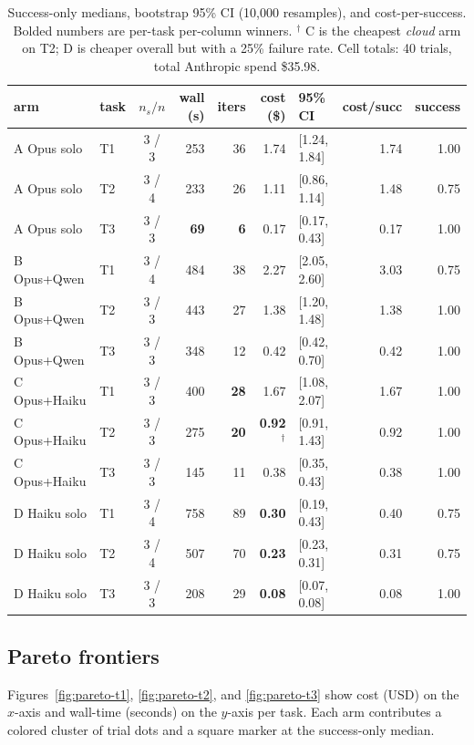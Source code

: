 \documentclass[11pt,a4paper]{article}
\begin{document}
\begin{table}[H]
\centering
\small
\begin{tabular}{l l c r r r l r r}
\toprule
\textbf{arm} & \textbf{task} & \textbf{$n_{s}/n$} & \textbf{wall (s)} & \textbf{iters} & \textbf{cost (\$)} & \textbf{95\% CI} & \textbf{cost/succ} & \textbf{success} \\
\midrule
A Opus solo   & T1 & 3 / 3 & 253 & 36 & 1.74 & [1.24, 1.84] & 1.74 & 1.00 \\
A Opus solo   & T2 & 3 / 4 & 233 & 26 & 1.11 & [0.86, 1.14] & 1.48 & 0.75 \\
A Opus solo   & T3 & 3 / 3 & \textbf{69} & \textbf{6}  & 0.17 & [0.17, 0.43] & 0.17 & 1.00 \\
\midrule
B Opus+Qwen   & T1 & 3 / 4 & 484 & 38 & 2.27 & [2.05, 2.60] & 3.03 & 0.75 \\
B Opus+Qwen   & T2 & 3 / 3 & 443 & 27 & 1.38 & [1.20, 1.48] & 1.38 & 1.00 \\
B Opus+Qwen   & T3 & 3 / 3 & 348 & 12 & 0.42 & [0.42, 0.70] & 0.42 & 1.00 \\
\midrule
C Opus+Haiku  & T1 & 3 / 3 & 400 & \textbf{28} & 1.67 & [1.08, 2.07] & 1.67 & 1.00 \\
C Opus+Haiku  & T2 & 3 / 3 & 275 & \textbf{20} & \textbf{0.92}$^\dagger$ & [0.91, 1.43] & 0.92 & 1.00 \\
C Opus+Haiku  & T3 & 3 / 3 & 145 & 11 & 0.38 & [0.35, 0.43] & 0.38 & 1.00 \\
\midrule
D Haiku solo  & T1 & 3 / 4 & 758 & 89 & \textbf{0.30} & [0.19, 0.43] & 0.40 & 0.75 \\
D Haiku solo  & T2 & 3 / 4 & 507 & 70 & \textbf{0.23} & [0.23, 0.31] & 0.31 & 0.75 \\
D Haiku solo  & T3 & 3 / 3 & 208 & 29 & \textbf{0.08} & [0.07, 0.08] & 0.08 & 1.00 \\
\bottomrule
\end{tabular}
\caption{Success-only medians, bootstrap 95\% CI (10,000 resamples), and cost-per-success. Bolded numbers are per-task per-column winners. $^\dagger$ C is the cheapest \emph{cloud} arm on T2; D is cheaper overall but with a 25\% failure rate. Cell totals: 40 trials, total Anthropic spend \$35.98.}
\label{tab:summary}
\end{table}

\subsection{Pareto frontiers}

Figures~\ref{fig:pareto-t1}, \ref{fig:pareto-t2}, and \ref{fig:pareto-t3} show cost (USD) on the $x$-axis and wall-time (seconds) on the $y$-axis per task. Each arm contributes a colored cluster of trial dots and a square marker at the success-only median.
\end{document}
